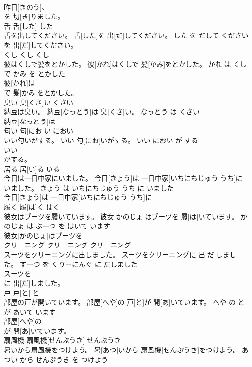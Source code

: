 \documentclass[8pt]{extreport}
\begin{document}
\begin{CJK}{UTF8}{min}
\\	昨日[きのう]、
\\	を 切[き]りました。		
\\	舌	舌[した]	した	
\\	舌を出してください。	舌[した]を 出[だ]してください。	した を だして ください	
\\	を 出[だ]してください。		
\\	くし	くし	くし	
\\	彼はくしで髪をとかした。	彼[かれ]はくしで 髪[かみ]をとかした。	かれ は くし で かみ を とかした	
\\	彼[かれ]は
\\	で 髪[かみ]をとかした。		
\\	臭い	臭[くさ]い	くさい	
\\	納豆は臭い。	納豆[なっとう]は 臭[くさ]い。	なっとう は くさい	
\\	納豆[なっとう]は
\\	匂い	匂[にお]い	におい	
\\	いい匂いがする。	いい 匂[にお]いがする。	いい におい が する	
\\	いい
\\	がする。		
\\	居る	居[い]る	いる	
\\	今日は一日中家にいました。	今日[きょう]は 一日中家[いちにちじゅう うち]にいました。	きょう は いちにちじゅう うち に いました	
\\	今日[きょう]は 一日中家[いちにちじゅう うち]に
\\	履く	履[は]く	はく	
\\	彼女はブーツを履いています。	彼女[かのじょ]はブーツを 履[は]いています。	かのじょ は ぶーつ を はいて います	
\\	彼女[かのじょ]はブーツを
\\	クリーニング	クリーニング	クリーニング	
\\	スーツをクリーニングに出しました。	スーツをクリーニングに 出[だ]しました。	すーつ を くりーにんぐ に だしました	
\\	スーツを
\\	に 出[だ]しました。		
\\	戸	戸[と]	と	
\\	部屋の戸が開いています。	部屋[へや]の 戸[と]が 開[あ]いています。	へや の と が あいて います	
\\	部屋[へや]の
\\	が 開[あ]いています。		
\\	扇風機	扇風機[せんぷうき]	せんぷうき	
\\	暑いから扇風機をつけよう。	暑[あつ]いから 扇風機[せんぷうき]をつけよう。	あつい から せんぷうき を つけよう	

\end{CJK}
\end{document}
